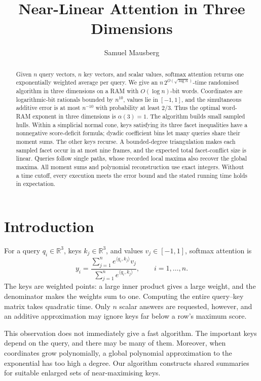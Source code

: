 \documentclass[notab,a4paper,UKenglish,numberwithinsect]{socg-lipics-v2021}
\title{Near-Linear Attention in Three Dimensions}
\author{Samuel Mausberg}{Independent Researcher}{samuelmausberg@gmail.com}{}{}
\newcommand{\R}{\mathbb R}
\newcommand{\ip}[2]{\langle #1,#2\rangle}
\begin{document}
\maketitle
\begin{abstract}
Given $n$ query vectors, $n$ key vectors, and scalar values, softmax attention returns one exponentially weighted average per query. We give an $n\,2^{O(\sqrt{\log n})}$-time randomised algorithm in three dimensions on a RAM with $O(\log n)$-bit words. Coordinates are logarithmic-bit rationals bounded by $n^{10}$, values lie in $[-1,1]$, and the simultaneous additive error is at most $n^{-10}$ with probability at least $2/3$. Thus the optimal word-RAM exponent in three dimensions is $\alpha(3)=1$. The algorithm builds small sampled hulls. Within a simplicial normal cone, keys satisfying its three facet inequalities have a nonnegative score-deficit formula; dyadic coefficient bins let many queries share their moment sums. The other keys recurse. A bounded-degree triangulation makes each sampled facet occur in at most nine frames, and the expected total facet-conflict size is linear. Queries follow single paths, whose recorded local maxima also recover the global maxima. All moment sums and polynomial reconstruction use exact integers. Without a time cutoff, every execution meets the error bound and the stated running time holds in expectation.
\end{abstract}

\section{Introduction}\label{sec:intro}
For a query $q_i\in\R^3$, keys $k_j\in\R^3$, and values $v_j\in[-1,1]$, softmax attention is
\begin{equation}\label{eq:attention}
 y_i=\frac{\sum_{j=1}^n e^{\ip{q_i}{k_j}}v_j}
               {\sum_{j=1}^n e^{\ip{q_i}{k_j}}},\qquad i=1,\ldots,n.
\end{equation}
The keys are weighted points: a large inner product gives a large weight, and the denominator makes the weights sum to one. Computing the entire query--key matrix takes quadratic time. Only $n$ scalar answers are requested, however, and an additive approximation may ignore keys far below a row's maximum score.

This observation does not immediately give a fast algorithm. The important keys depend on the query, and there may be many of them. Moreover, when coordinates grow polynomially, a global polynomial approximation to the exponential has too high a degree. Our algorithm constructs shared summaries for suitable enlarged sets of near-maximising keys.
\end{document}
